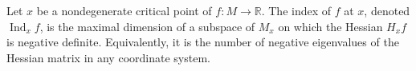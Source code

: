 Let $x$ be a nondegenerate critical point of $f: M \to \mathbb{R}$. The index of $f$ at $x$, denoted $\operatorname{Ind}_x f$, is the maximal dimension of a subspace of $M_x$ on which the Hessian $H_x f$ is negative definite. Equivalently, it is the number of negative eigenvalues of the Hessian matrix in any coordinate system.
